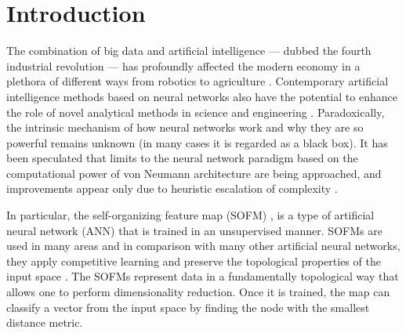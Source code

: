 \documentclass[pra,showkeys,twocolumn,showpacs]{revtex4-1}
\begin{document}
\section{Introduction}
The combination of big data and artificial intelligence ---  dubbed the fourth industrial revolution --- has profoundly affected the modern economy in a plethora of different ways from robotics to agriculture \cite{Lecun2015, ghahramani2015,schwab2017,esteva2019, tyrsa2017}.
Contemporary artificial intelligence methods based on neural networks also have the potential to enhance the role of novel analytical methods in science and engineering \cite{kaggle2014, radovic2018, butler2018, radovic2018}.
Paradoxically, the intrinsic mechanism of how neural networks work and why they are so powerful remains unknown (in many cases it is regarded as a black box).
It has been speculated that limits to the neural network paradigm based on the computational power of von Neumann architecture are being approached,
and improvements appear only due to heuristic escalation of complexity \cite{marcus2018,sze2017,kourtis2020}.

In particular, the self-organizing feature map (SOFM) \cite{kohonen1990,kohonen1996,kohonen1997}, is a type of artificial neural network (ANN)
that is trained in an unsupervised manner.
SOFMs are used in many areas \cite{vilibic2016, guido1998, doszkocs1990, jones2012,mori2019,corsello2017,zhu2018,chea2016}
and in comparison with many other artificial neural networks, they apply competitive learning and preserve the topological properties of the input space \cite{kiviluotoa1996}.
The SOFMs represent data in a fundamentally topological way that allows one to perform dimensionality reduction.
Once it is trained, the map can classify a vector from the input space by finding the node with the smallest distance metric.
\end{document}
